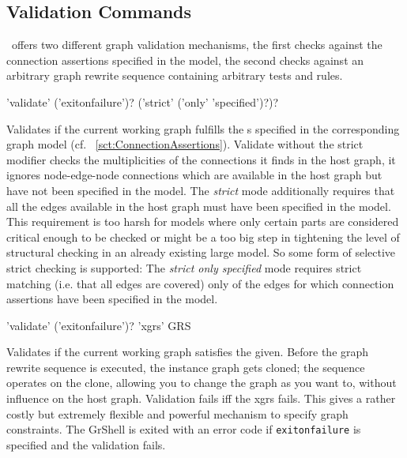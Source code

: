\subsection{Validation Commands}

\GrG\ offers two different graph validation mechanisms, 
the first checks against the connection assertions specified in the model,
the second checks against an arbitrary graph rewrite sequence containing arbitrary tests and rules.

\begin{rail}
  'validate' ('exitonfailure')? ('strict' ('only' 'specified')?)?
\end{rail}
Validates if the current working graph fulfills the s specified in the corresponding graph model (cf. ~\ref{sct:ConnectionAssertions}).
Validate without the strict modifier checks the multiplicities of the connections it finds in the host graph, 
it ignores node-edge-node connections which are available in the host graph but have not been specified in the model.
The \emph{strict} mode additionally requires that all the edges available in the host graph must have been specified in the model.
This requirement is too harsh for models where only certain parts are considered critical enough to be checked
or might be a too big step in tightening the level of structural checking in an already existing large model.
So some form of selective strict checking is supported:
The \emph{strict only specified} mode requires strict matching (i.e. that all edges are covered) only of the edges for which connection assertions have been specified in the model.

\begin{rail}
  'validate' ('exitonfailure')? 'xgrs' GRS
\end{rail}
Validates if the current working graph satisfies the  given.
Before the graph rewrite sequence is executed, the instance graph gets cloned;
the sequence operates on the clone, allowing you to change the graph as you want to, without influence on the host graph.
Validation fails iff the xgrs fails.
This gives a rather costly but extremely flexible and powerful mechanism to specify graph constraints.
The GrShell is exited with an error code if \texttt{exitonfailure} is specified and the validation fails.

